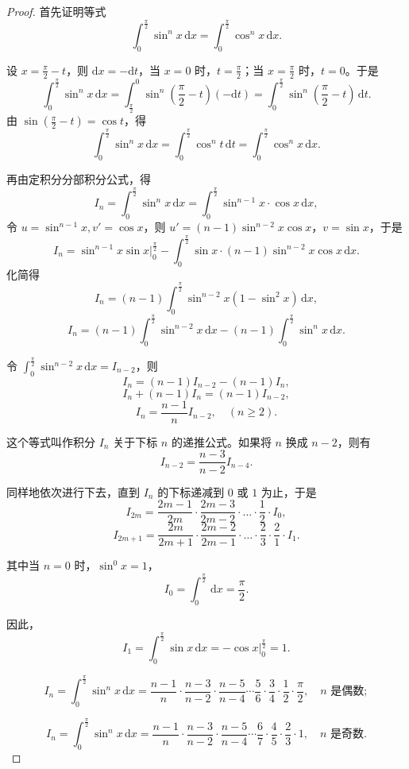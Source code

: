 \documentclass[12pt]{ctexart}
\begin{document}
\begin{proof}
首先证明等式
\[
\int_{0}^{\frac{\pi}{2}} \sin^n x \, \mathrm{d}x = \int_{0}^{\frac{\pi}{2}} \cos^n x \, \mathrm{d}x.
\]

设 $x = \frac{\pi}{2} - t$，则 $\mathrm{d}x = -\mathrm{d}t$，当 $x = 0$ 时，$t = \frac{\pi}{2}$；当 $x = \frac{\pi}{2}$ 时，$t = 0$。于是
\[
\int_{0}^{\frac{\pi}{2}} \sin^n x \, \mathrm{d}x = \int_{\frac{\pi}{2}}^{0} \sin^n \left( \frac{\pi}{2} - t \right) (-\mathrm{d}t)
= \int_{0}^{\frac{\pi}{2}} \sin^n \left( \frac{\pi}{2} - t \right) \, \mathrm{d}t.
\]
由 $\sin\left(\frac{\pi}{2} - t\right) = \cos t$，得
\[
\int_{0}^{\frac{\pi}{2}} \sin^n x \, \mathrm{d}x = \int_{0}^{\frac{\pi}{2}} \cos^n t \, \mathrm{d}t = \int_{0}^{\frac{\pi}{2}} \cos^n x \, \mathrm{d}x.
\]

再由定积分分部积分公式，得
\[
I_n = \int_{0}^{\frac{\pi}{2}} \sin^n x \, \mathrm{d}x = \int_{0}^{\frac{\pi}{2}} \sin^{n-1} x \cdot \cos x \, \mathrm{d}x,
\]
令 $u = \sin^{n-1} x, v' = \cos x$，则 $u' = (n-1) \sin^{n-2} x \cos x$，$v = \sin x$，于是
\[
I_n = \sin^{n-1} x \sin x \Big|_{0}^{\frac{\pi}{2}} - \int_{0}^{\frac{\pi}{2}} \sin x \cdot (n-1) \sin^{n-2} x \cos x \, \mathrm{d}x.
\]
化简得
\[
I_n = (n-1) \int_{0}^{\frac{\pi}{2}} \sin^{n-2} x (1 - \sin^2 x) \, \mathrm{d}x,
\]
\[
I_n = (n-1) \int_{0}^{\frac{\pi}{2}} \sin^{n-2} x \, \mathrm{d}x - (n-1) \int_{0}^{\frac{\pi}{2}} \sin^n x \, \mathrm{d}x.
\]

令 $\int_{0}^{\frac{\pi}{2}} \sin^{n-2} x \, \mathrm{d}x = I_{n-2}$，则
\[
I_n = (n-1) I_{n-2} - (n-1) I_n,
\]
\[
I_n + (n-1) I_n = (n-1) I_{n-2},
\]
\[
I_n = \frac{n-1}{n} I_{n-2}, \quad (n \geq 2).
\]

这个等式叫作积分 $I_n$ 关于下标 $n$ 的递推公式。如果将 $n$ 换成 $n-2$，则有
\[
I_{n-2} = \frac{n-3}{n-2} I_{n-4}.
\]

同样地依次进行下去，直到 $I_n$ 的下标递减到 $0$ 或 $1$ 为止，于是
\[
I_{2m} = \frac{2m-1}{2m} \cdot \frac{2m-3}{2m-2} \cdot \dots \cdot \frac{1}{2} \cdot I_0,
\]
\[
I_{2m+1} = \frac{2m}{2m+1} \cdot \frac{2m-2}{2m-1} \cdot \dots \cdot \frac{2}{3} \cdot \frac{2}{1} \cdot I_1.
\]

其中当 $n = 0$ 时，$\sin^0 x = 1$，
\[
I_0 = \int_{0}^{\frac{\pi}{2}} \, \mathrm{d}x = \frac{\pi}{2}.
\]

因此，
\[
I_1 = \int_{0}^{\frac{\pi}{2}} \sin x \, \mathrm{d}x = -\cos x \Big|_{0}^{\frac{\pi}{2}} = 1.
\]

\[
I_n = \int_{0}^{\frac{\pi}{2}} \sin^n x \, \mathrm{d}x = \frac{n-1}{n} \cdot \frac{n-3}{n-2} \cdot \frac{n-5}{n-4} \cdots \frac{5}{6} \cdot \frac{3}{4} \cdot \frac{1}{2} \cdot \frac{\pi}{2}, \quad n \text{ 是偶数};
\]

\[
I_n = \int_{0}^{\frac{\pi}{2}} \sin^n x \, \mathrm{d}x = \frac{n-1}{n} \cdot \frac{n-3}{n-2} \cdot \frac{n-5}{n-4} \cdots \frac{6}{7} \cdot \frac{4}{5} \cdot \frac{2}{3} \cdot 1, \quad n \text{ 是奇数}.
\]

\end{proof}
\end{document}
